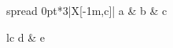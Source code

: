 \documentclass{article}
\begin{document}
\begin{tabu*}spread 0pt{*{3}{|X[-1m,c]}|}
a & b & c \\
\end{tabu*}

\begin{longtabu*}{lc}
d & e \\
\end{longtabu*}
\end{document}
